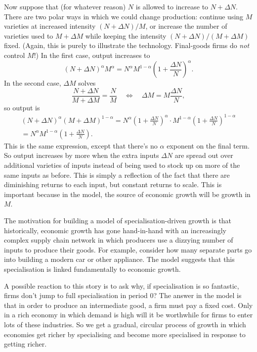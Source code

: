 \documentclass[11pt,letterpaper,reqno,oneside]{article}
\begin{document}
Now suppose that (for whatever reason) $N$ is allowed to increase to $N + \Delta N$. There are two polar ways in which we could change production: continue using $M$ varieties at increased intensity $(N+\Delta N)/M$, or increase the number of varieties used to $M + \Delta M$ while keeping the intensity $(N+\Delta N)/(M+\Delta M)$ fixed. (Again, this is purely to illustrate the technology. Final-goods firms do \emph{not} control $M$!) In the first case, output increases to
%
\begin{equation*}
	(N + \Delta N)^\alpha M^\alpha 
	= N^\alpha M^{1-\alpha} \left( 1 + \frac{\Delta N}{N} \right)^\alpha .
\end{equation*}
%
In the second case, $\Delta M$ solves
%
\begin{equation*}
	\frac{ N + \Delta N }{ M + \Delta M } = \frac{ N }{ M } 
	\quad\Leftrightarrow\quad
	\Delta M = M \frac{\Delta N}{N} ,
\end{equation*}
%
so output is
%
\begin{multline*}
	( N + \Delta N )^\alpha ( M + \Delta M )^{1-\alpha}
	= N^\alpha \left( 1 + \frac{\Delta N}{N} \right)^\alpha \cdot M^{1-\alpha} 
	\left( 1 + \frac{\Delta N}{N} \right)^{1-\alpha}
	\\
	= N^\alpha M^{1-\alpha} 
	\left( 1 + \frac{\Delta N}{N} \right) .
\end{multline*}
%
This is the same expression, except that there's no $\alpha$ exponent on the final term. So output increases by more when the extra inputs $\Delta N$ are spread out over additional varieties of inputs instead of being used to stock up on more of the same inputs as before. This is simply a reflection of the fact that there are diminishing returns to each input, but constant returns to scale. This is important because in the \textcite{Romer1987} model, the source of economic growth will be growth in $M$.


The motivation for building a model of specialisation-driven growth is that historically, economic growth has gone hand-in-hand with an increasingly complex supply chain network in which producers use a dizzying number of inputs to produce their goods. For example, consider how many separate parts go into building a modern car or other appliance. The \textcite{Romer1987} model suggests that this specialisation is linked fundamentally to economic growth.

A possible reaction to this story is to ask why, if specialisation is so fantastic, firms don't jump to full specialisation in period 0? The answer in the \textcite{Romer1987} model is that in order to produce an intermediate good, a firm must pay a fixed cost. Only in a rich economy in which demand is high will it be worthwhile for firms to enter lots of these industries. So we get a gradual, circular process of growth in which economies get richer by specialising and become more specialised in response to getting richer.
\end{document}

